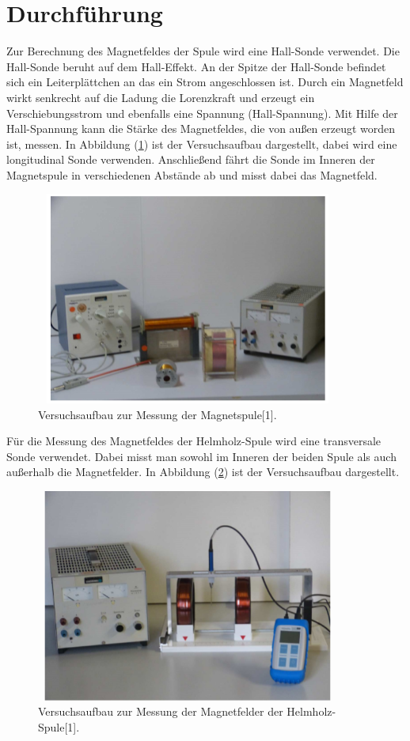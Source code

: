 \section{Durchführung}
Zur Berechnung des Magnetfeldes der Spule wird eine Hall-Sonde verwendet.
Die Hall-Sonde beruht auf dem Hall-Effekt. An der Spitze der Hall-Sonde befindet sich
ein Leiterplättchen an das ein Strom angeschlossen ist. Durch ein Magnetfeld wirkt senkrecht
auf die Ladung die Lorenzkraft und erzeugt ein Verschiebungsstrom und ebenfalls eine Spannung (Hall-Spannung).
Mit Hilfe der Hall-Spannung kann die Stärke des Magnetfeldes, die von außen erzeugt worden ist, messen.
In Abbildung (\ref{abb:4}) ist der Versuchsaufbau dargestellt, dabei wird eine longitudinal Sonde verwenden.
Anschließend fährt die Sonde im Inneren der Magnetspule in verschiedenen Abstände ab und misst dabei das
Magnetfeld.
\begin{figure}[H]
  \centering
  \includegraphics[width=10cm, height= 7cm]{Abb4.png}
  \caption{Versuchsaufbau zur Messung der Magnetspule[1].}
  \label{abb:4}
\end{figure}
Für die Messung des Magnetfeldes der Helmholz-Spule wird eine transversale Sonde verwendet.
Dabei misst man sowohl im Inneren der beiden Spule als auch außerhalb die Magnetfelder.
In Abbildung (\ref{abb:5}) ist der Versuchsaufbau dargestellt.
\begin{figure}[H]
  \centering
  \includegraphics[width=10cm, height= 7cm]{Abb5.png}
  \caption{Versuchsaufbau zur Messung der Magnetfelder der Helmholz-Spule[1].}
  \label{abb:5}
\end{figure}
